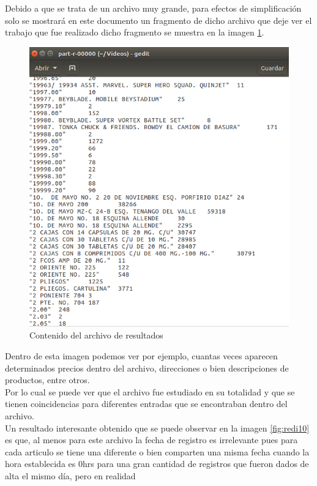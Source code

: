 Debido a que se trata de un archivo muy grande, para efectos de simplificación solo se mostrará en este documento un
fragmento de dicho archivo que deje ver el trabajo que fue realizado dicho fragmento se muestra en la imagen \ref{fig:redi9}.
\begin{figure}[!htbp]
	\hypertarget{fig:redi9}{\hspace{1pt}}
	\begin{center}
		\includegraphics[width=.9\textwidth]{capitulo4/images/ejemplo10.png}
		\caption{Contenido del archivo de resultados}
		\label{fig:redi9}
	\end{center}
\end{figure}
Dentro de esta imagen podemos ver por ejemplo, cuantas veces aparecen determinados precios dentro del archivo,
direcciones o bien descripciones de productos, entre otros.\\
Por lo cual se puede ver que el archivo fue estudiado en su totalidad y que se tienen coincidencias para diferentes
entradas que se encontraban dentro del archivo.\\
Un resultado interesante obtenido que se puede observar en la imagen \ref{fig:redi10} es que, al menos para este archivo la fecha
de registro es irrelevante pues para cada articulo se tiene una diferente o bien comparten una misma fecha cuando la
hora establecida es 0hrs para una gran cantidad de registros que fueron dados de alta el mismo día, pero en realidad
